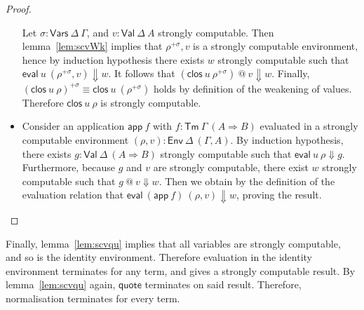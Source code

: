 \documentclass[a4paper,english,cleveref,autoref,draft]{lipics-v2019}
\newcommand{\agdaSymb}[1]{\mathsf{#1}}
\newcommand{\Tm}{\agdaSymb{Tm}}
\newcommand{\app}{\agdaSymb{app}}
\newcommand{\Vars}{\agdaSymb{Vars}}
\newcommand{\Val}{\agdaSymb{Val}}
\newcommand{\Env}{\agdaSymb{Env}}
\newcommand{\clos}{\agdaSymb{clos}}
\newcommand{\eval}{\agdaSymb{eval}}
\newcommand{\q}{\agdaSymb{quote}}
\newcommand{\Ra}{\Rightarrow}
\newcommand{\Da}{\Downarrow}
\begin{document}
\begin{proof}
\begin{itemize}
    Let $\sigma : \Vars\ \Delta\ \Gamma$, and $v : \Val\ \Delta\ A$ strongly
    computable. Then lemma~\ref{lem:scvWk} implies that $\rho^{+\sigma},v$ is a
    strongly computable environment, hence by induction hypothesis there exists
    $w$ strongly computable such that $\eval\ u\ (\rho^{+\sigma},v) \Da w$.
    It follows that $(\clos\ u\ \rho^{+\sigma})\ @\ v \Da w$. Finally,
    $(\clos\ u\ \rho)^{+\sigma} \equiv \clos\ u\ (\rho^{+\sigma})$ holds by definition
    of the weakening of values. Therefore $\clos\ u\ \rho$ is strongly computable.
  \item Consider an application $\app\ f$ with $f : \Tm\ \Gamma\ (A \Ra B)$
    evaluated in a strongly computable environment $(\rho,v) : \Env\ \Delta\ (\Gamma,A)$.
    By induction hypothesis, there exists $g : \Val\ \Delta\ (A \Ra B)$
    strongly computable such that $\eval\ u\ \rho \Da g$. Furthermore, because
    $g$ and $v$ are strongly computable, there exist $w$ strongly computable such that
    $g\ @\ v \Da w$. Then we obtain by the definition of the evaluation relation that
    $\eval\ (\app\ f)\ (\rho,v) \Da w$, proving the result.
  \end{itemize}
\end{proof}

Finally, lemma~\ref{lem:scvqu} implies that all variables are strongly
computable, and so is the identity environment. Therefore evaluation in the
identity environment terminates for any term, and gives a strongly computable
result. By lemma~\ref{lem:scvqu} again, $\q$ terminates on said result.
Therefore, normalisation terminates for every term.


\end{document}
